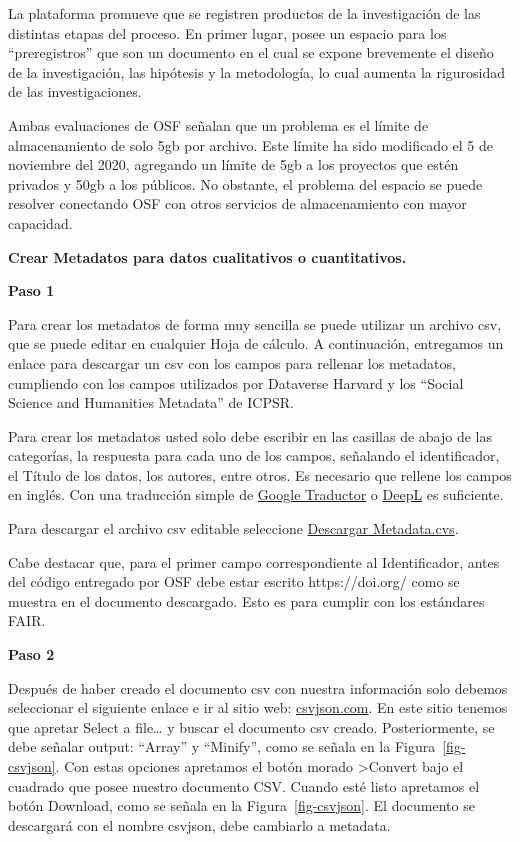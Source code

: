\documentclass[
  spanish,
  letterpaper,
  DIV=11,
  numbers=noendperiod]{scrreprt}
\begin{document}
La plataforma promueve que se registren productos de la investigación de
las distintas etapas del proceso. En primer lugar, posee un espacio para
los ``preregistros'' que son un documento en el cual se expone
brevemente el diseño de la investigación, las hipótesis y la
metodología, lo cual aumenta la rigurosidad de las investigaciones.

Ambas evaluaciones de OSF señalan que un problema es el límite de
almacenamiento de solo 5gb por archivo. Este límite ha sido modificado
el 5 de noviembre del 2020, agregando un límite de 5gb a los proyectos
que estén privados y 50gb a los públicos. No obstante, el problema del
espacio se puede resolver conectando OSF con otros servicios de
almacenamiento con mayor capacidad.

\textbf{Crear Metadatos para datos cualitativos o cuantitativos.}

\textbf{Paso 1}

Para crear los metadatos de forma muy sencilla se puede utilizar un
archivo csv, que se puede editar en cualquier Hoja de cálculo. A
continuación, entregamos un enlace para descargar un csv con los campos
para rellenar los metadatos, cumpliendo con los campos utilizados por
Dataverse Harvard y los ``Social Science and Humanities Metadata'' de
ICPSR.

Para crear los metadatos usted solo debe escribir en las casillas de
abajo de las categorías, la respuesta para cada uno de los campos,
señalando el identificador, el Título de los datos, los autores, entre
otros. Es necesario que rellene los campos en inglés. Con una traducción
simple de \href{https://translate.google.com/}{Google Traductor} o
\href{https://www.deepl.com/es/translator}{DeepL} es suficiente.

Para descargar el archivo csv editable seleccione
\href{https://raw.githubusercontent.com/franciscomeneses/CADIS/master/metadata.csv}{Descargar
Metadata.cvs}.

Cabe destacar que, para el primer campo correspondiente al
Identificador, antes del código entregado por OSF debe estar escrito
https://doi.org/ como se muestra en el documento descargado. Esto es
para cumplir con los estándares FAIR.

\textbf{Paso 2}

Después de haber creado el documento csv con nuestra información solo
debemos seleccionar el siguiente enlace e ir al sitio web:
\href{https://csvjson.com/csv2json}{csvjson.com}. En este sitio tenemos
que apretar Select a file\ldots{} y buscar el documento csv creado.
Posteriormente, se debe señalar output: ``Array'' y ``Minify'', como se
señala en la Figura~\ref{fig-csvjson}. Con estas opciones apretamos el
botón morado \textgreater Convert bajo el cuadrado que posee nuestro
documento CSV. Cuando esté listo apretamos el botón Download, como se
señala en la Figura~\ref{fig-csvjson}. El documento se descargará con el
nombre csvjson, debe cambiarlo a metadata.
\end{document}
